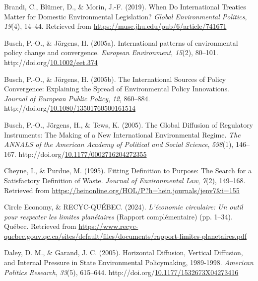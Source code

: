 \documentclass[12pt]{ulaval}
\newenvironment{CSLReferences}%
  {}%
  {\par}
\begin{document}
\begin{CSLReferences}{1}{0}
Brandi, C., Blümer, D., \& Morin, J.-F. (2019). When {Do} {International} {Treaties} {Matter} for {Domestic} {Environmental} {Legislation}? \emph{Global Environmental Politics}, \emph{19}(4), 14--44. Retrieved from \url{https://muse.jhu.edu/pub/6/article/741671}

Busch, P.-O., \& Jörgens, H. (2005a). International patterns of environmental policy change and convergence. \emph{European Environment}, \emph{15}(2), 80--101. http://doi.org/\href{https://doi.org/10.1002/eet.374}{10.1002/eet.374}

Busch, P.-O., \& Jörgens, H. (2005b). The {International} {Sources} of {Policy} {Convergence}: {Explaining} the {Spread} of {Environmental} {Policy} {Innovations}. \emph{Journal of European Public Policy}, \emph{12}, 860--884. http://doi.org/\href{https://doi.org/10.1080/13501760500161514}{10.1080/13501760500161514}

Busch, P.-O., Jörgens, H., \& Tews, K. (2005). The {Global} {Diffusion} of {Regulatory} {Instruments}: {The} {Making} of a {New} {International} {Environmental} {Regime}. \emph{The ANNALS of the American Academy of Political and Social Science}, \emph{598}(1), 146--167. http://doi.org/\href{https://doi.org/10.1177/0002716204272355}{10.1177/0002716204272355}

Cheyne, I., \& Purdue, M. (1995). Fitting {Definition} to {Purpose}: {The} {Search} for a {Satisfactory} {Definition} of {Waste}. \emph{Journal of Environmental Law}, \emph{7}(2), 149--168. Retrieved from \url{https://heinonline.org/HOL/P?h=hein.journals/jenv7&i=155}

Circle Economy, \& RECYC-QUÉBEC. (2024). \emph{L'économie circulaire: Un outil pour respecter les limites planétaires} (Rapport complémentaire) (pp. 1--34). Québec. Retrieved from \url{https://www.recyc-quebec.gouv.qc.ca/sites/default/files/documents/rapport-limites-planetaires.pdf}

Daley, D. M., \& Garand, J. C. (2005). Horizontal {Diffusion}, {Vertical} {Diffusion}, and {Internal} {Pressure} in {State} {Environmental} {Policymaking}, 1989-1998. \emph{American Politics Research}, \emph{33}(5), 615--644. http://doi.org/\href{https://doi.org/10.1177/1532673X04273416}{10.1177/1532673X04273416}


\end{CSLReferences}
\end{document}
